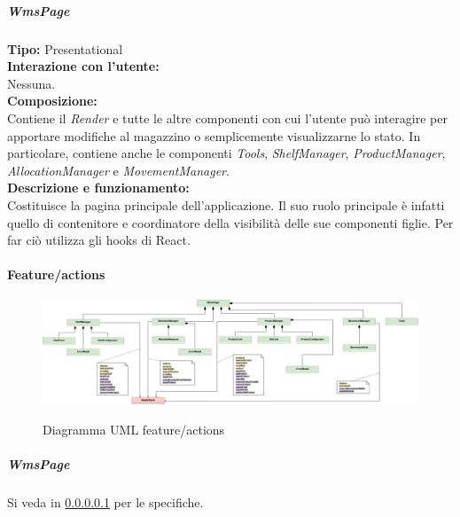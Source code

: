\subparagraph{\colorbox{verde_uml}{WmsPage}}\label{wmsPage}
\textbf{Tipo:} Presentational \\
\textbf{Interazione con l'utente:} \\
Nessuna.\\
\textbf{Composizione:} \\
Contiene il \textit{Render} e tutte le altre componenti con cui l'utente può interagire per apportare modifiche al magazzino o semplicemente visualizzarne lo stato. In particolare, contiene anche le componenti \textit{Tools}, \textit{ShelfManager}, \textit{ProductManager}, \textit{AllocationManager} e \textit{MovementManager}.\\
\textbf{Descrizione e funzionamento:} \\
Costituisce la pagina principale dell'applicazione. Il suo ruolo principale è infatti quello di contenitore e coordinatore della visibilità delle sue componenti figlie. Per far ciò utilizza gli hooks di React.\\

\paragraph{Feature/actions}
\begin{landscape}
\begin{figure}[H]
    \centering
    \includegraphics[width=1.5\textwidth]{images/UML/feature_actions.drawio.png}
    \label{fig:UML_feature_actions}
    \caption{Diagramma UML feature/actions}
\end{figure}
\end{landscape}
\newpage

\subparagraph{\colorbox{verde_uml}{WmsPage}}
Si veda in \ref{wmsPage} per le specifiche.

